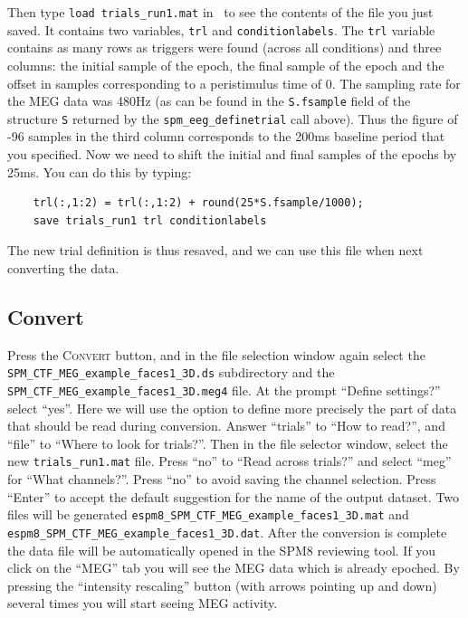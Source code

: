 Then type \texttt{load trials\_run1.mat} in \matlab\, to see the contents of the file you just saved. It contains two variables, \texttt{trl} and \texttt{conditionlabels}. The \texttt{trl} variable contains as many rows as triggers were found (across all conditions) and three columns: the initial sample of the epoch, the final sample of the epoch and the offset in samples corresponding to a peristimulus time of 0. The sampling rate for the MEG data was 480Hz (as can be found in the \texttt{S.fsample} field of the structure \texttt{S} returned by the \texttt{spm\_eeg\_definetrial} call above). Thus the figure of -96 samples in the third column corresponds to the 200ms baseline period that you specified. Now we need to shift the initial and final samples of the epochs by 25ms. You can do this by typing:

\begin{verbatim}
    trl(:,1:2) = trl(:,1:2) + round(25*S.fsample/1000);
    save trials_run1 trl conditionlabels
\end{verbatim}

The new trial definition is thus resaved, and we can use this file when next converting the data.

\subsection{Convert}

Press the \textsc{Convert} button, and in the file selection window again select the \texttt{SPM\_CTF\_MEG\_example\_\-faces1\_3D.ds} subdirectory and the \texttt{\hyphenchar{}\relax SPM\_CTF\_MEG\_example\_faces1\_3D.meg4} file. At the prompt ``Define settings?'' select ``yes''. Here we will use the option to define more precisely the part of data that should be read during conversion. Answer ``trials'' to ``How to read?'', and ``file'' to ``Where to look for trials?''. Then in the file selector window, select the new \texttt{trials\_run1.mat} file. Press ``no'' to ``Read across trials?'' and select ``meg'' for ``What channels?''. Press ``no'' to avoid saving the channel selection. Press ``Enter'' to accept the default suggestion for the name of the output dataset. Two files will be generated \texttt{espm8\_SPM\_CTF\_MEG\_example\_faces1\_3D.mat} and \texttt{espm8\_SPM\_CTF\_MEG\_example\_faces1\_3D.dat}. After the conversion is complete the data file will be automatically opened in the SPM8 reviewing tool. If you click on the ``MEG'' tab you will see the MEG data which is already epoched. By pressing the ``intensity rescaling'' button (with arrows pointing up and down) several times you will start seeing MEG activity.

